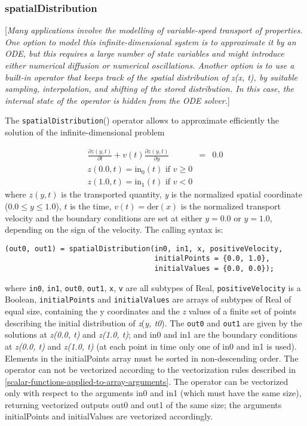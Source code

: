 \subsubsection{spatialDistribution}

{[}\emph{Many applications involve the modelling of variable-speed
transport of properties. One option to model this infinite-dimensional
system is to approximate it by an ODE, but this requires a large number
of state variables and might introduce either numerical diffusion or
numerical oscillations. Another option is to use a built-in operator
that keeps track of the spatial distribution of z(x, t), by suitable
sampling, interpolation, and shifting of the stored distribution. In
this case, the internal state of the operator is hidden from the ODE
solver.}{]}

The \lstinline!spatialDistribution!() operator allows to approximate efficiently the
solution of the infinite-dimensional problem

\begin{eqnarray*}
\frac{\partial z(y,t)}{\partial t}+v(t)\frac{\partial z(y,t)}{\partial y}&=&0.0\\
z(0.0, t)=\mathrm{in}_0(t) \text{ if $v\ge 0$}\\
z(1.0, t)=\mathrm{in}_1(t) \text{ if $v<0$}
\end{eqnarray*}
where $z(y, t)$ is the transported quantity, \emph{y} is the
normalized spatial coordinate ($0.0 \le y \le 1.0$), $t$ is the
time, $v(t)=\mathrm{der}(x)$ is the normalized
transport velocity and the boundary conditions are set at either
$y=0.0$ or $y=1.0$, depending on the sign of the velocity.
The calling syntax is:
\begin{lstlisting}[language=modelica]
(out0, out1) = spatialDistribution(in0, in1, x, positiveVelocity,
                                   initialPoints = {0.0, 1.0},
                                   initialValues = {0.0, 0.0});
\end{lstlisting}
where \lstinline!in0!, \lstinline!in1!, \lstinline!out0!, \lstinline!out1!, \lstinline!x!, \lstinline!v! are all subtypes of Real,
\lstinline!positiveVelocity! is a Boolean, \lstinline!initialPoints! and \lstinline!initialValues! are
arrays of subtypes of Real of equal size, containing the y coordinates
and the \emph{z} values of a finite set of points describing the initial
distribution of \emph{z}(\emph{y, t0}). The \lstinline!out0! and \lstinline!out1! are given by
the solutions at \emph{z(0.0, t)} and \emph{z(1.0, t)}; and in0 and in1
are the boundary conditions at \emph{z(0.0, t)} and \emph{z(1.0, t)} (at
each point in time only one of in0 and in1 is used). Elements in the
initialPoints array must be sorted in non-descending order. The operator
can not be vectorized according to the vectorization rules described in
\autoref{scalar-functions-applied-to-array-arguments}. The operator can be vectorized only with respect to the
arguments in0 and in1 (which must have the same size), returning
vectorized outputs out0 and out1 of the same size; the arguments
initialPoints and initialValues are vectorized accordingly.

